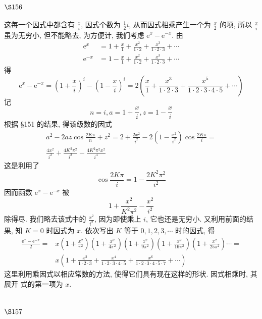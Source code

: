 \section{$\S 156$}

这每一个因式中都含有 $\frac{x}{i}$, 因式个数为 $\frac{1}{2} i$, 从而因式相乘产生一个为 $\frac{x}{2}$ 的项, 所以 $\frac{x}{i}$ 虽为无穷小, 但不能略去, 为方便计, 我们考虑 $\mathrm{e}^{x}-\mathrm{e}^{-x}$. 由
\[
\begin{aligned}
\mathrm{e}^{x} & =1+\frac{x}{1}+\frac{x^{2}}{1 \cdot 2}+\frac{x^{3}}{1 \cdot 2 \cdot 3}+\cdots \\
\mathrm{e}^{-x} & =1-\frac{x}{1}+\frac{x^{2}}{1 \cdot 2}+\frac{x^{3}}{1 \cdot 2 \cdot 3}+\cdots
\end{aligned}
\]
得
\[
\mathrm{e}^{x}-\mathrm{e}^{-x}=\left(1+\frac{x}{i}\right)^{i}-\left(1-\frac{x}{i}\right)^{i}=2\left(\frac{x}{1}+\frac{x^{3}}{1 \cdot 2 \cdot 3}+\frac{x^{5}}{1 \cdot 2 \cdot 3 \cdot 4 \cdot 5}+\cdots\right)
\]
记
\[
n=i, a=1+\frac{x}{i}, z=1-\frac{x}{i}
\]
根据 §151 的结果, 得该级数的因式
\[
\begin{gathered}
a^{2}-2 a z \cos \frac{2 K \pi}{n}+z^{2}=2+\frac{2 x^{2}}{i^{2}}-2\left(1-\frac{x^{2}}{i^{2}}\right) \cos \frac{2 K \pi}{i}= \\
\frac{4 x^{2}}{i^{2}}+\frac{4 K^{2} \pi^{2}}{i^{2}}-\frac{4 K^{2} \pi^{2} x^{2}}{i^{4}}
\end{gathered}
\]
这是利用了
\[
\cos \frac{2 K \pi}{i}=1-\frac{2 K^{2} \pi^{2}}{i^{2}}
\]
因而函数 $\mathrm{e}^{x}-\mathrm{e}^{-x}$ 被
\[
1+\frac{x^{2}}{K^{2} \pi^{2}}-\frac{x^{2}}{i^{2}}
\]
除得尽. 我们略去该式中的 $\frac{x^{2}}{i^{2}}$, 因为即使乘上 $i$, 它也还是无穷小. 又利用前面的结果, 知 $K=0$ 时因式为 $x$. 依次写出 $K$ 等于 $0,1,2,3, \cdots$ 时的因式, 得
\[
\begin{aligned}
\frac{\mathrm{e}^{x}-\mathrm{e}^{-x}}{2}= & x\left(1+\frac{x^{2}}{\pi^{2}}\right)\left(1+\frac{x^{2}}{4 \pi^{2}}\right)\left(1+\frac{x^{2}}{9 \pi^{2}}\right)\left(1+\frac{x^{2}}{16 \pi^{2}}\right)\left(1+\frac{x^{2}}{25 \pi^{2}}\right) \cdots= \\
& x\left(1+\frac{x^{2}}{1 \cdot 2 \cdot 3}+\frac{x^{4}}{1 \cdot 2 \cdot 3 \cdot 4 \cdot 5}+\frac{x^{6}}{1 \cdot 2 \cdot 3 \cdot 4 \cdot 5 \cdot 7}+\cdots\right)
\end{aligned}
\]
这里利用乘因式以相应常数的方法, 使得它们具有现在这样的形状. 因式相乘时, 其展开 式的第一项为 $x$.

\section{$\S 157$}

